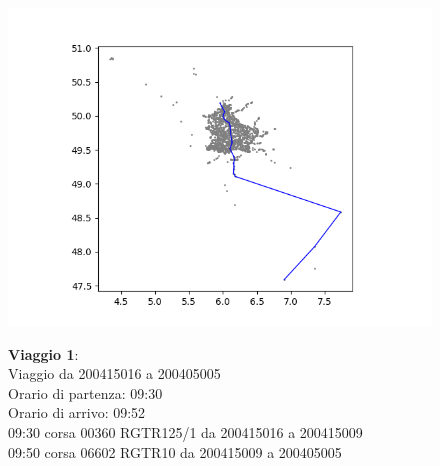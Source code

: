 \documentclass{article}
\begin{document}
\begin{figure}[H]
	\begin{minipage}{0.55\linewidth}
		\centering
		\hspace*{-6cm}\includegraphics[width=1.0\linewidth, valign=t]{figures/Figure_1}
	\end{minipage}
	\hspace*{-4cm}\begin{minipage}{0.7\linewidth}
		\textbf{Viaggio 1}:\\
		Viaggio da 200415016 a 200405005\\
		Orario di partenza: 09:30\\
		Orario di arrivo: 09:52\\
		09:30 corsa 00360 RGTR125/1 da 200415016 a 200415009\\
		09:50 corsa 06602 RGTR10 da 200415009 a 200405005
			\end{minipage}
\end{figure}
\end{document}
